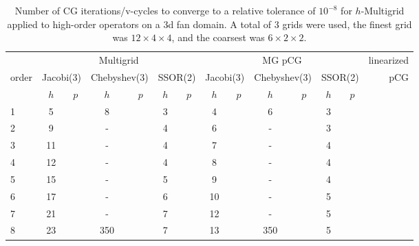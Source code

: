 \begin{table}
  \caption{\label{tab:fan3}  Number of CG iterations/v-cycles to converge to a relative tolerance of $10^{-8}$ for $h$-Multigrid applied to high-order operators on a 3d fan domain. A total of 3 grids were used, the finest grid was $12\times 4\times 4$, and the coarsest was $6\times 2\times 2$.}
		\centering
    \begin{tabular}{|l|c|c|c|c|c|c|c|c|c|c|c|c|r|} 
	    \hline
						        & \multicolumn{6}{c|}{Multigrid} & \multicolumn{6}{c|}{MG pCG} &          linearized \\
																 \cline{2-13}
									order &  \multicolumn{2}{c|}{\scriptsize  Jacobi(3)} &  \multicolumn{2}{c|}{\scriptsize Chebyshev(3)} & \multicolumn{2}{c|}{\scriptsize  SSOR(2)} & \multicolumn{2}{c|}{\scriptsize Jacobi(3)} &  \multicolumn{2}{c|}{\scriptsize Chebyshev(3)} & \multicolumn{2}{c|}{\scriptsize SSOR(2)} & pCG\\
						\hline
						 & $h$ & $p$ & $h$ & $p$& $h$ & $p$& $h$ & $p$& $h$ & $p$& $h$ & $p$& \\
						 \cline{2-13}
						 
  1 & 5 & & 8 & & 3 & & 4 & & 6 & & 3 & & \\
  2 & 9 & & - & & 4 & & 6 & & - & & 3 & & \\
  3 & 11 & & - & & 4 & & 7 & & - & & 4 & & \\
  4 & 12 & & - & & 4 & & 8 & & - & & 4 & & \\
  5 & 15 & & - & & 5 & & 9 & & - & & 4 & & \\
  6 & 17 & & - & & 6 & & 10 & & - & & 5 & & \\
  7 & 21 & & - & & 7 & & 12 & & - & & 5 & & \\
  8 & 23 & & 350 & & 7 & & 13 & & 350 & & 5 & & \\
			\hline
	  \end{tabular}
\end{table}
% 
